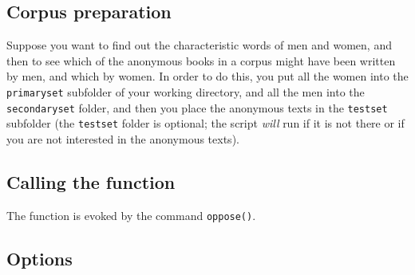 \documentclass[11pt,a4paper]{article}
\def\underscore{\raisebox{-.8ex}{-}}
\def\code#1{{\tt #1}}
\begin{document}
\subsection{Corpus preparation}

Suppose you want to find out the characteristic words of men and women,
and then to see which of the anonymous books in a corpus might have
been written by men, and which by women. In order to do this, you
put all the women into the \code{primary\underscore{}set} subfolder
of your working directory, and all the men into the \code{secondary\underscore{}set}
folder, and then you place the anonymous texts in the \code{test\underscore{}set}
subfolder (the \code{test\underscore{}set} folder is optional;
the script \textit{will} run if it is not there or if you are not interested
in the anonymous texts).


\subsection{Calling the function}

The function is evoked by the command \code{oppose()}.


\subsection{Options}
\end{document}

